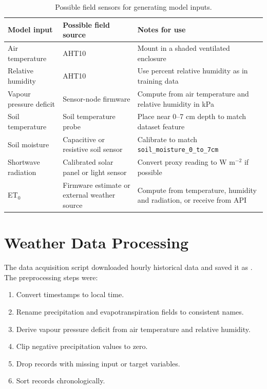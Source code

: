 \documentclass[12pt,a4paper]{report}
\begin{document}
\begin{table}[H]
	\centering
	\caption{Possible field sensors for generating model inputs.}
	\label{tab:field_sensor_inputs}
	\begin{tabular}{p{}p{}p{}}
		\toprule
		Model input & Possible field source & Notes for use\\
		\midrule
		Air temperature & AHT10 & Mount in a shaded ventilated enclosure\\
		Relative humidity & AHT10 & Use percent relative humidity as in training data\\
		Vapour pressure deficit & Sensor-node firmware & Compute from air temperature and relative humidity in kPa\\
		Soil temperature & Soil temperature probe & Place near 0--7 cm depth to match dataset feature\\
		Soil moisture & Capacitive or resistive soil sensor & Calibrate to match \texttt{soil\_moisture\_0\_to\_7cm}\\
		Shortwave radiation & Calibrated solar panel or light sensor & Convert proxy reading to W m$^{-2}$ if possible\\
		ET$_0$ & Firmware estimate or external weather source & Compute from temperature, humidity and radiation, or receive from API\\
		\bottomrule
	\end{tabular}
\end{table}

\section{Weather Data Processing}
The data acquisition script downloaded hourly historical data and saved it as . The preprocessing steps were:
\begin{enumerate}[label=(\roman*)]
	\item Convert timestamps to local time.
	\item Rename precipitation and evapotranspiration fields to consistent names.
	\item Derive vapour pressure deficit from air temperature and relative humidity.
	\item Clip negative precipitation values to zero.
	\item Drop records with missing input or target variables.
	\item Sort records chronologically.
\end{enumerate}
\end{document}
